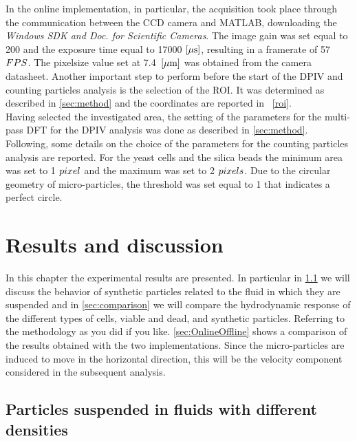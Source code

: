 \documentclass[journal]{IEEEtran}
\theoremstyle{definition}
\theoremstyle{remark}
\begin{document}
In the online implementation, in particular, the acquisition took place through the communication between the CCD camera and MATLAB, downloading the \textit{Windows SDK and Doc. for Scientific Cameras}.
The image gain was set equal to 200 and the exposure time equal to 17000 $[\rm\mu s]$, resulting in a framerate of 57 $FPS$. The pixelsize value set at 7.4~$[\rm\mu m]$ was obtained from the camera datasheet.
Another important step to perform before the start of the DPIV and
counting particles analysis is the selection of the ROI.
It was determined as described in \sect\ref{sec:method} and the coordinates are reported in ~\tab\ref{roi}. 
\\Having selected the investigated area, the setting of the parameters for the multi-pass DFT for the DPIV analysis was done as described in \sect\ref{sec:method}. Following, some details on the choice of the parameters for the counting particles analysis are reported. For the yeast cells and the silica beads the minimum area was set to 1 $pixel$ and the maximum was set to 2 $pixels$. Due to the circular geometry of micro-particles, the threshold was set equal to 1 that indicates a perfect circle.

\section{Results and discussion}
In this chapter the experimental results are presented. In particular in \sect\ref{sec:suspended-particles} we will discuss the behavior of synthetic particles related to the fluid in which they are suspended and in \sect\ref{sec:comparison} we will compare the hydrodynamic response of the different types of cells, viable and dead, and synthetic particles. Referring to the methodology as you did if you like. \sect\ref{sec:OnlineOffline} shows a comparison of the results obtained with the two implementations.
Since the micro-particles are induced to move in the horizontal direction, this will be the velocity component considered in the subsequent analysis. 


\subsection{Particles suspended in fluids with different densities}\label{sec:suspended-particles}
\end{document}
